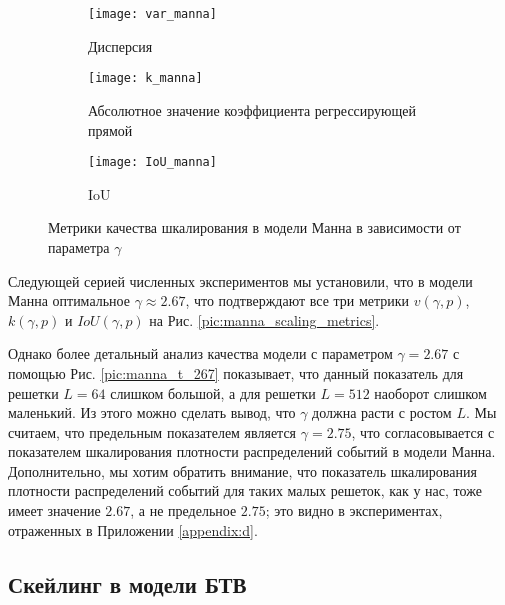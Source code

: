 \begin{figure}[h]
	\centering
	\hspace{-25mm}
	\begin{subfigure}[t]{0.27\textwidth}
		\centering
		\texttt{[image: var\_manna]}
		\caption{Дисперсия}
	\end{subfigure}
	\hspace{10mm}
	\begin{subfigure}[t]{0.27\textwidth}
		\centering
		\texttt{[image: k\_manna]}
		\caption{Абсолютное значение коэффициента регрессирующей прямой}
	\end{subfigure}
	\hspace{10mm}
	\begin{subfigure}[t]{0.27\textwidth}
		\centering
		\texttt{[image: IoU\_manna]}
		\caption{IoU}
	\end{subfigure}
	\caption{Метрики качества шкалирования в модели Манна в зависимости от параметра $\gamma$}\label{pic:manna_scaling_metrics}
\end{figure}

Следующей серией численных экспериментов мы установили, что в модели Манна оптимальное $\gamma \approx 2.67$, что подтверждают все три метрики $v(\gamma, p)$, $k(\gamma, p)$ и $IoU(\gamma, p)$ на Рис. \eqref{pic:manna_scaling_metrics}. 

Однако более детальный анализ качества модели с параметром $\gamma = 2.67$ с помощью Рис. \eqref{pic:manna_t_267} показывает, что данный показатель для решетки $L=64$ слишком большой, а для решетки $L=512$ наоборот слишком маленький. Из этого можно сделать вывод, что $\gamma$ должна расти с ростом $L$. Мы считаем, что предельным показателем является $\gamma=2.75$, что согласовывается с показателем шкалирования плотности распределений событий в модели Манна. Дополнительно, мы хотим обратить внимание, что показатель шкалирования плотности распределений событий для таких малых решеток, как у нас, тоже имеет значение $2.67$, а не предельное $2.75$; это видно в экспериментах, отраженных в Приложении \eqref{appendix:d}.

\subsection{Скейлинг в модели БТВ}

